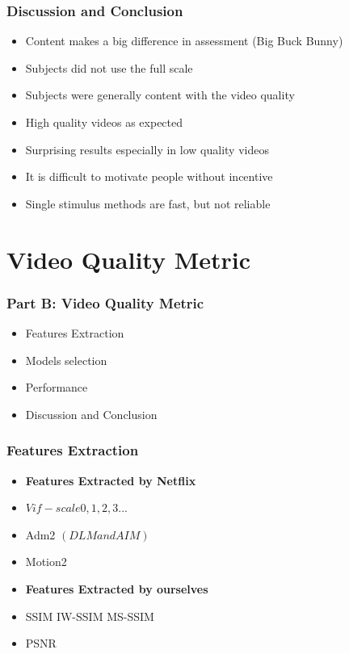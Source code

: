 \documentclass{beamer}
\begin{document}
\begin{frame}
	\frametitle{Discussion and Conclusion}
    \begin{itemize} 
    	\item Content makes a big difference in assessment (Big Buck Bunny)
    	\item Subjects did not use the full scale
        \item Subjects were generally content with the video quality
    	\item High quality videos as expected
    	\item Surprising results especially in low quality videos
        \item It is difficult to motivate people without incentive
        \item Single stimulus methods are fast, but not reliable
    \end{itemize}
\end{frame}

\section{Video Quality Metric} 
\begin{frame}
\frametitle{Part B: Video Quality Metric}
\begin{itemize}
	\item Features Extraction
	\item Models selection
	\item Performance
	\item Discussion and Conclusion
\end{itemize}
\end{frame} 

\begin{frame}
\frametitle{Features Extraction}
\begin{itemize}
	\item \textbf{Features Extracted by Netflix}\itemindent 30pt 
	\item $Vif-scale0,1,2,3...$
    \item Adm2 $(DLM and AIM)$
    \item Motion2
\end{itemize}
\begin{itemize}
    \item \textbf{Features Extracted by ourselves}\itemindent 30pt 
	\item SSIM IW-SSIM MS-SSIM
    \item PSNR
 \end{itemize}    
 \end{frame}
\end{document}
